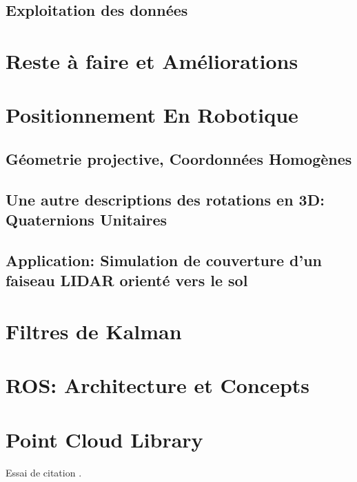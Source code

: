 \documentclass[12pt,a4paper]{report}
\begin{document}
	\section{Exploitation des données}

\chapter{Reste à faire et Améliorations}



\begin{appendix}
	\chapter{Positionnement En Robotique}
		\section{Géometrie projective, Coordonnées Homogènes}
		\section{Une autre descriptions des rotations en 3D: Quaternions Unitaires}
		\section{Application: Simulation de couverture d'un faiseau LIDAR orienté vers le sol}
	
	\chapter{Filtres de Kalman}
	
	\chapter{ROS: Architecture et Concepts}
	
	\chapter{Point Cloud Library}
	Essai de citation \cite{kaplan_understanding_2006}.

\end{appendix}

\nocite{*}


\end{document}
